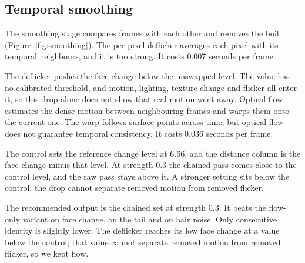 
\subsection{Temporal smoothing}
The smoothing stage compares frames with each other and removes the boil (Figure~\ref{fig:smoothing}). The per-pixel deflicker averages each pixel with its temporal neighbours, and it is too strong. It costs 0.007 seconds per frame.

The deflicker pushes the face change below the unswapped level. The value has no calibrated threshold, and motion, lighting, texture change and flicker all enter it, so this drop alone does not show that real motion went away. Optical flow estimates the dense motion between neighbouring frames and warps them onto the current one. The warp follows surface points across time, but optical flow does not guarantee temporal consistency. It costs 0.036 seconds per frame.

The control sets the reference change level at 6.66, and the distance column is the face change minus that level. At strength 0.3 the chained pass comes close to the control level, and the raw pass stays above it. A stronger setting sits below the control; the drop cannot separate removed motion from removed flicker.

The recommended output is the chained set at strength 0.3. It beats the flow-only variant on face change, on the tail and on hair noise. Only consecutive identity is slightly lower. The deflicker reaches its low face change at a value below the control; that value cannot separate removed motion from removed flicker, so we kept flow.

